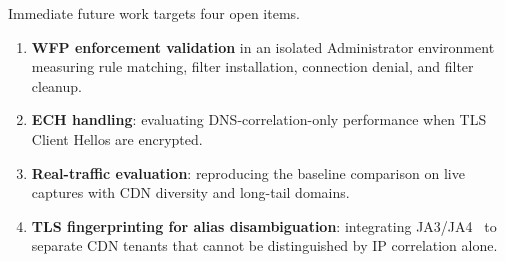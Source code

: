\documentclass[conference]{IEEEtran}
\begin{document}
Immediate future work targets four open items.
\begin{enumerate}
\item \textbf{WFP enforcement validation} in an isolated Administrator
environment measuring rule matching, filter installation, connection
denial, and filter cleanup.
\item \textbf{ECH handling}: evaluating DNS-correlation-only performance
when TLS Client Hellos are encrypted.
\item \textbf{Real-traffic evaluation}: reproducing the baseline
comparison on live captures with CDN diversity and long-tail domains.
\item \textbf{TLS fingerprinting for alias disambiguation}: integrating
JA3/JA4~\cite{ja3} to separate CDN tenants that cannot be distinguished
by IP correlation alone.
\end{enumerate}
\end{document}
